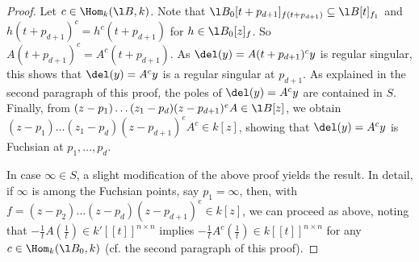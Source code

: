 \documentclass[a4paper, 11pt]{article}
\begin{document}
\begin{proof}
	 Let $c\in\Hom_k(\l B,k)$. Note that $\l B_0[t+p_{d+1}]_{f(t+p_{d+1})}\subseteq \l B[t]_{f_1}$ and $h(t+p_{d+1})^c=h^c(t+p_{d+1})$ for $h\in \l B_0[z]_{f}$. So  $A(t+p_{d+1})^c=A^c(t+p_{d+1})$.
	  As $\del(y)=A(t+p_{d+1})^cy$ is regular singular, this shows that $\del (y)=A^cy$ is a regular singular at $p_{d+1}$. As explained in the second paragraph of this proof, the poles of $\del (y)=A^cy$ are contained in $S$.
	 Finally, from $(z-p_1)\ldots(z_1-p_d)(z-p_{d+1})^eA\in \l B[z]$, we obtain $(z-p_1)\ldots(z_1-p_d)(z-p_{d+1})^eA^c\in k[z]$, showing that $\del (y)=A^cy$ is Fuchsian at $p_1,\ldots,p_{d}$.
	 
	 In case $\infty\in S$, a slight modification of the above proof yields the result. In detail, if $\infty$ is among the Fuchsian points, say $p_1=\infty$, then, with $f=(z-p_2)\ldots(z-p_d)(z-p_{d+1})^e\in k[z]$, we can proceed as above, noting that $-\frac{1}{t}A(\frac{1}{t})\in k'[[t]]^{n\times n}$ implies $-\frac{1}{t}A^c(\frac{1}{t})\in k[[t]]^{n\times n}$ for any $c\in\Hom_k(\l B_0,k)$ (cf. the second paragraph of this proof).
	 

\end{proof}
\end{document}
